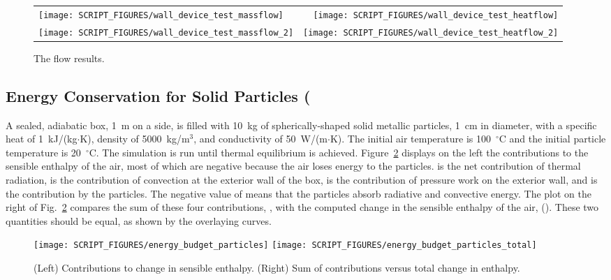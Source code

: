 \documentclass[11pt]{book}
\begin{document}
\begin{figure}[!ht]
\begin{tabular*}{\textwidth}{lr}
\texttt{[image: SCRIPT\_FIGURES/wall\_device\_test\_massflow]} &
\texttt{[image: SCRIPT\_FIGURES/wall\_device\_test\_heatflow]} \\
\texttt{[image: SCRIPT\_FIGURES/wall\_device\_test\_massflow\_2]} &
\texttt{[image: SCRIPT\_FIGURES/wall\_device\_test\_heatflow\_2]}
\end{tabular*}
\caption[The  results]{The  flow results.}
\label{mass_heat_wall_device_flow}
\end{figure}


\FloatBarrier

\subsection{Energy Conservation for Solid Particles (\texorpdfstring{})}
\label{energy_budget_particles}

A sealed, adiabatic box, 1~m on a side, is filled with 10~kg of spherically-shaped solid metallic particles, 1~cm in diameter, with a specific heat of 1~kJ/(kg$\cdot$K), density of 5000~kg/m$^3$, and conductivity of 50~W/(m$\cdot$K). The initial air temperature is 100~$^\circ$C and the initial particle temperature is 20~$^\circ$C. The simulation is run until thermal equilibrium is achieved. Figure~\ref{energy_budget_particles_figs} displays on the left the contributions to the sensible enthalpy of the air, most of which are negative because the air loses energy to the particles.  is the net contribution of thermal radiation,  is the contribution of convection at the exterior wall of the box,  is the contribution of pressure work on the exterior wall, and  is the contribution by the particles. The negative value of  means that the particles absorb radiative and convective energy. The plot on the right of Fig.~\ref{energy_budget_particles_figs} compares the sum of these four contributions, , with the computed change in the sensible enthalpy of the air, (). These two quantities should be equal, as shown by the overlaying curves.

\begin{figure}[ht]
\texttt{[image: SCRIPT\_FIGURES/energy\_budget\_particles]}
\texttt{[image: SCRIPT\_FIGURES/energy\_budget\_particles\_total]}
\caption[The  test case]{(Left) Contributions to change in sensible enthalpy. (Right) Sum of contributions versus total change in enthalpy.}
\label{energy_budget_particles_figs}
\end{figure}
\end{document}
